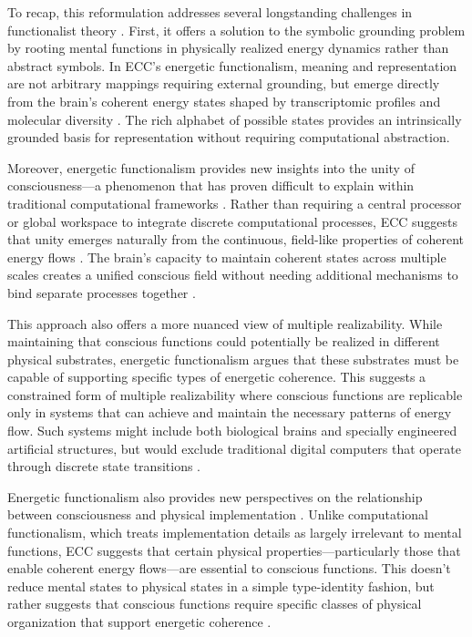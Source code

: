 \begin{refsection}
To recap, this reformulation addresses several longstanding challenges in functionalist theory \cite{polger2016multiple}. First, it offers a solution to the symbolic grounding problem by rooting mental functions in physically realized energy dynamics rather than abstract symbols. In ECC's energetic functionalism, meaning and representation are not arbitrary mappings requiring external grounding, but emerge directly from the brain's coherent energy states shaped by transcriptomic profiles and molecular diversity \cite{gillett2016reduction}. The rich alphabet of possible states provides an intrinsically grounded basis for representation without requiring computational abstraction.

Moreover, energetic functionalism provides new insights into the unity of consciousness—a phenomenon that has proven difficult to explain within traditional computational frameworks \cite{van1998dynamical}. Rather than requiring a central processor or global workspace \cite{Baars2013} to integrate discrete computational processes, ECC suggests that unity emerges naturally from the continuous, field-like properties of coherent energy flows \cite{McFadden2020}. The brain's capacity to maintain coherent states across multiple scales creates a unified conscious field without needing additional mechanisms to bind separate processes together \cite{thompson2011living}.

This approach also offers a more nuanced view of multiple realizability. While maintaining that conscious functions could potentially be realized in different physical substrates, energetic functionalism argues that these substrates must be capable of supporting specific types of energetic coherence. This suggests a constrained form of multiple realizability where conscious functions are replicable only in systems that can achieve and maintain the necessary patterns of energy flow. Such systems might include both biological brains and specially engineered artificial structures, but would exclude traditional digital computers that operate through discrete state transitions \cite{wheeler2010defense}.

Energetic functionalism also provides new perspectives on the relationship between consciousness and physical implementation \cite{mossio2015biological}. Unlike computational functionalism, which treats implementation details as largely irrelevant to mental functions, ECC suggests that certain physical properties—particularly those that enable coherent energy flows—are essential to conscious functions. This doesn't reduce mental states to physical states in a simple type-identity fashion, but rather suggests that conscious functions require specific classes of physical organization that support energetic coherence \cite{dupre2012processes}.


\end{refsection}
